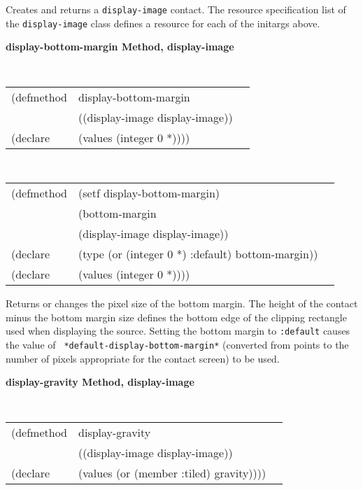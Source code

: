 \begin{flushright} \parbox[t]{6.125in}{
Creates and returns a {\tt display-image} contact.
The resource specification list of the {\tt display-image} class defines
a resource for each of the initargs above.
}\end{flushright}




{\samepage
{\large {\bf display-bottom-margin \hfill Method, display-image}}
\begin{flushright} \parbox[t]{6.125in}{
\tt
\begin{tabular}{lll}
\raggedright
(defmethod & display-bottom-margin & \\
& ((display-image  display-image)) \\
(declare & (values (integer 0 *))))
\end{tabular}
\rm}\end{flushright}}

\begin{flushright} \parbox[t]{6.125in}{
\tt
\begin{tabular}{lll}
\raggedright
(defmethod & (setf display-bottom-margin) & \\
& (bottom-margin \\
& (display-image  display-image)) \\
(declare &(type (or (integer 0 *) :default)  bottom-margin))\\
(declare & (values (integer 0 *))))
\end{tabular}
\rm}\end{flushright}

\begin{flushright} \parbox[t]{6.125in}{ 
Returns or changes the pixel size of the
bottom margin.  The height of the contact minus the bottom margin size defines
the bottom edge of the clipping rectangle used when displaying the source.
Setting the bottom margin to {\tt :default} causes the value of {\tt
*default-display-bottom-margin*} (converted from points to the number of pixels
appropriate for the contact screen) to be used.
  
}\end{flushright}



{\samepage  
{\large {\bf display-gravity \hfill Method, display-image}}
\begin{flushright} \parbox[t]{6.125in}{
\tt
\begin{tabular}{lll}
\raggedright
(defmethod & display-gravity & \\
& ((display-image  display-image)) \\
(declare & (values (or (member :tiled) gravity))))
\end{tabular}
\rm

}\end{flushright}}


